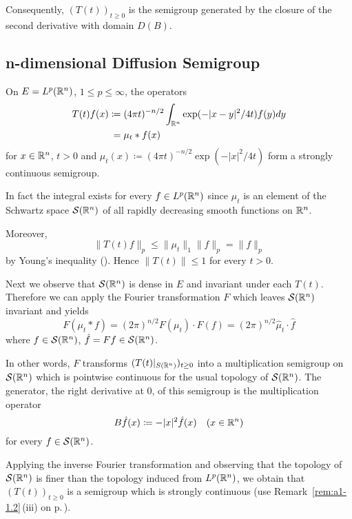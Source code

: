 Consequently, $(T(t))_{t \geq 0}$ is the semigroup generated by the closure of the second derivative with domain $D(B)$.
\subsection{n-dimensional Diffusion Semigroup}\label{subsec:a1-2.8}
On $E = L^{p}(\mathbb{R}^{n})$, $1 \leq p \leq \infty$, the operators
\begin{align*}
    T(t)f(x) \coloneqq{}& (4\pi t)^{-n/2} \int_{\mathbb{R}^{n}} \exp(-|x-y|^{2}/4t)f(y)dy \\
    ={}& \mu_{t}*f(x)
\end{align*}
for $x \in \mathbb{R}^{n}$, $t > 0$ and $\mu_{t}(x) \coloneqq (4\pi t)^{-n/2} \exp(-|x|^{2}/4t)$ form a strongly continuous semigroup.

In fact the integral exists for every $f \in L^{p}(\mathbb{R}^{n})$ since $\mu_{t}$ is an element of the Schwartz space $\mathcal{S}(\mathbb{R}^{n})$ of all rapidly decreasing smooth functions on $\mathbb{R}^{n}$.

Moreover,
\[
    \|T(t)f\|_{p} \leq \|\mu_{t}\|_{1}\|f\|_{p} = \|f\|_{p}
\]
by Young's inequality (\citet[p.28]{reedsimon:1975}). Hence $\|T(t)\| \leq 1$ for every $t > 0$.

Next we observe that $\mathcal{S}(\mathbb{R}^{n})$ is dense in $E$ and invariant under each $T(t)$.
Therefore we can apply the Fourier transformation $F$ which leaves $\mathcal{S}(\mathbb{R}^{n})$ invariant and yields
\[
    F(\mu_{t}*f) = (2\pi)^{n/2} F(\mu_{t}) \cdot F(f) = (2\pi)^{n/2} \hat{\mu}_{t}\cdot\hat{f}
\]
where $f \in \mathcal{S}(\mathbb{R}^{n})$, $\hat{f} = Ff \in \mathcal{S}(\mathbb{R}^{n})$.

In other words, $F$ transforms $(T(t)\vert_{ S(\mathbb{R}^{n})})_{t \geq 0}$ into a multiplication semigroup on $\mathcal{S}(\mathbb{R}^{n})$ which is pointwise continuous for the usual topology of $\mathcal{S}(\mathbb{R}^{n})$.
The generator, \ie the right derivative at $0$, of this semigroup is the multiplication operator
\[
    B\hat{f}(x) \coloneqq -|x|^{2}\hat{f}(x) \quad (x \in \mathbb{R}^{n})
\]
for every $f \in \mathcal{S}(\mathbb{R}^{n})$.

Applying the inverse Fourier transformation and observing that the topology of $\mathcal{S}(\mathbb{R}^{n})$ is finer than the topology induced from $L^{p}(\mathbb{R}^{n})$, we obtain that $(T(t))_{t \geq 0}$ is a semigroup which is strongly continuous (use Remark~\ref{rem:a1-1.2}\,(iii) on p.\,\pageref{rem:a1-1.2}).

